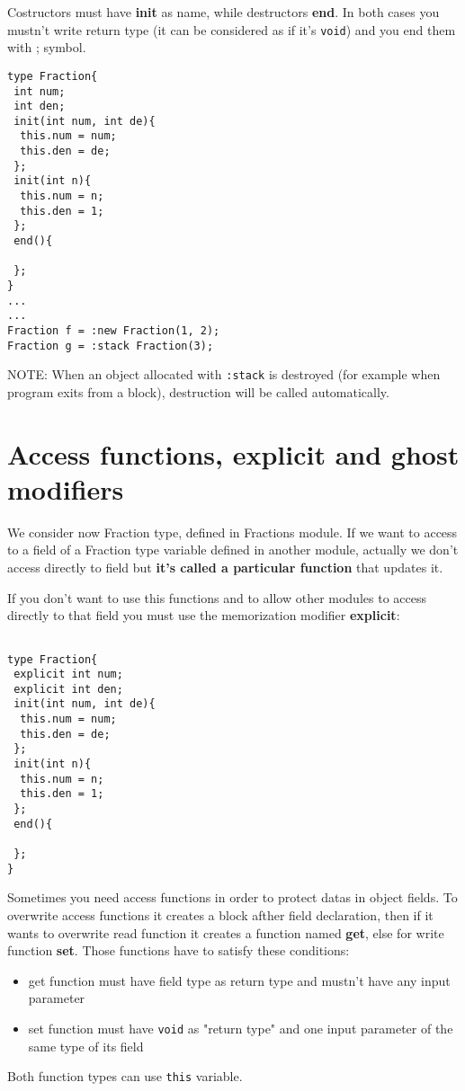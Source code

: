 \documentclass[10pt]{book}%
\newcommand{\code}[1]{\texttt{#1}}
\renewcommand{\emph}[1]{\textbf{#1}}
\newenvironment{codeenv}{
\begin{mdframed}[backgroundcolor=black!20,topline=false,leftline=false,rightline=false,bottomline=false]
}
{\end{mdframed}}
\begin{document}
Costructors must have \emph{init} as name, while destructors \emph{end}. In both cases you mustn't write return type (it can be considered as if it's \code{void}) and you end them with ; symbol.
\begin{codeenv}
\begin{verbatim}
type Fraction{
 int num;
 int den;
 init(int num, int de){
  this.num = num;
  this.den = de;
 };
 init(int n){
  this.num = n;
  this.den = 1;
 };
 end(){
 
 };
}
...
...
Fraction f = :new Fraction(1, 2);
Fraction g = :stack Fraction(3);
\end{verbatim}
\end{codeenv}

NOTE: When an object allocated with \code{:stack} is destroyed (for example when program exits from a block), destruction will be called automatically.

\section{Access functions, explicit and ghost modifiers}
We consider now Fraction type, defined in Fractions module. If we want to access to a field of a Fraction type variable defined in another module, actually we don't access directly to field but \emph{it's called a particular function} that updates it.

If you don't want to use this functions and to allow other modules to access directly to that field you must use the memorization modifier \emph{explicit}:
\begin{codeenv}
\begin{verbatim}

type Fraction{
 explicit int num;
 explicit int den;
 init(int num, int de){
  this.num = num;
  this.den = de;
 };
 init(int n){
  this.num = n;
  this.den = 1;
 };
 end(){
 
 };
}
\end{verbatim}
\end{codeenv}

Sometimes you need access functions in order to protect datas in object fields. To overwrite access functions it creates a block afther field declaration, then if it wants to overwrite read function it creates a function named \emph{get}, else for write function \emph{set}. Those functions have to satisfy these conditions:
\begin{itemize}
\item get function must have field type as return type and mustn't have any input parameter
\item set function must have \code{void} as "return type" and one input parameter of the same type of its field
\end{itemize}
Both function types can use \code{this} variable.
\end{document}
